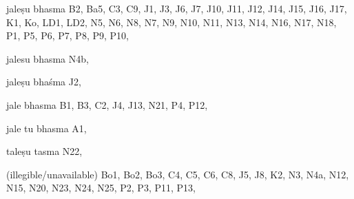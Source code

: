 \begin{marma}[hp03_092]


\item[jaleṣu bhasma] B2, Ba5, C3, C9, J1, J3, J6, J7, J10, J11, J12, J14, J15, J16, J17, K1, Ko, LD1, LD2, N5, N6, N8, N7, N9, N10, N11, N13, N14, N16, N17, N18, P1, P5, P6, P7, P8, P9, P10, 
\item[jalesu bhasma] N4b,
\item[jaleṣu bhaśma] J2,
\item[jale bhasma] B1, B3, C2, J4, J13, N21, P4, P12, 
\item[jale tu bhasma] A1,  
\item[taleṣu tasma] N22,
\item[(illegible/unavailable)] Bo1, Bo2, Bo3, C4, C5, C6, C8, J5, J8, K2, N3, N4a, N12, N15, N20, N23, N24, N25, P2, P3, P11, P13, 

  \begin{description}
  \end{description}

\end{marma}

